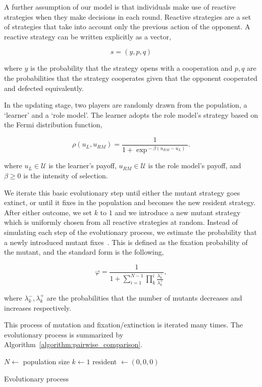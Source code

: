 \documentclass[11pt]{article}
\theoremstyle{plainCl1}
\theoremstyle{plainCl2}
\begin{document}
A further assumption of our model is that individuals make use of reactive
strategies when they make decisions in each round. Reactive strategies are a set
of strategies that take into account only the previous action of the opponent.
A reactive strategy can be written explicitly as a vector,

\[s=(y, p, q)\]

where \(y\) is the probability that the strategy opens with a cooperation and
\(p, q\) are the probabilities that the strategy cooperates given that the
opponent cooperated and defected equivalently.

In the updating stage, two players are randomly drawn from the population, a
`learner' and a `role model'. The learner adopts the role model's strategy
based on the Fermi distribution function, %

\begin{equation} \label{Eq:rho}
\rho(u_{L}, u_{RM}) = \frac{1}{1\!+\! \exp^{\!-\!\beta (u_{RM}\!-\!u_{L})}}.
\end{equation}

where $u_{L}\!\in\! \mathcal{U}$ is the learner's payoff, $u_{RM}\!\in\!
\mathcal{U}$ is the role model's payoff, and $\beta\!\ge\!0$ is the intensity of
selection.

We iterate this basic evolutionary step until either the mutant strategy goes
extinct, or until it fixes in the population and becomes the new resident
strategy. After either outcome, we set $k$ to $1$ and we introduce a new mutant
strategy which is uniformly chosen from all reactive strategies at random.
Instead of simulating each step of the evolutionary process, we estimate the
probability that a newly introduced mutant fixes~\cite{nowak2004emergence}. This
is defined as the fixation probability of the mutant, and the standard form is
the following,

\begin{equation}\label{eq:appendix_fixation_probability}
\varphi = \frac{1}{1+\sum\limits_{i=1}^{N-1}\prod\limits_k^i \frac{\lambda^-_k}{\lambda^+_k}},
\end{equation}

where \(\lambda^-_k, \lambda^+_k\) are the probabilities that the number of
mutants decreases and increases respectively.

This process of mutation and fixation/extinction is iterated many times. The
evolutionary process is summarized by
Algorithm~\ref{algorithm:pairwise_comparison}.

\begin{algorithm}[!htbp]
  \SetAlgoLined
   $N \leftarrow$ population size\;
   $k \leftarrow 1$\;
   resident $\leftarrow (0, 0, 0)$\;
     \caption{Evolutionary process}\label{algorithm:pairwise_comparison}
\end{algorithm}
\end{document}
